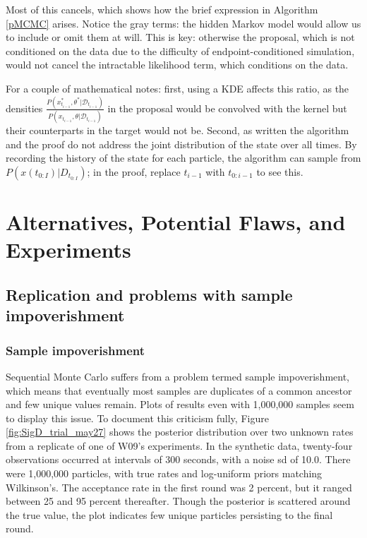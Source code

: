 \documentclass{article}
\begin{document}
Most of this cancels, which shows how the brief expression in Algorithm \ref{pMCMC} arises. Notice the gray terms: the hidden Markov model would allow us to include or omit them at will. This is key: otherwise the proposal, which is not conditioned on the data due to the difficulty of endpoint-conditioned simulation, would not cancel the intractable likelihood term, which conditions on the data.

 For a couple of mathematical notes: first, using a KDE affects this ratio, as the densities $\frac{P(x_{t_{i-1}}^*,\theta^*| \mathcal{D}_{t_{i-1}})}{P(x_{t_{i-1}}, \theta| \mathcal{D}_{t_{i-1}})}$ in the proposal would be convolved with the kernel but their counterparts in the target would not be. Second, as written the algorithm and the proof do not address the joint distribution of the state over all times. By recording the history of the state for each particle, the algorithm can sample from $P(x(t_{0:I})|D_{t_{0:I}})$; in the proof, replace $t_{i-1}$ with $t_{0:i-1}$ to see this. 

\section{Alternatives, Potential Flaws, and Experiments}
\subsection{Replication and problems with sample impoverishment}

\subsubsection{Sample impoverishment}
Sequential Monte Carlo suffers from a problem termed sample impoverishment, which means that eventually most samples are duplicates of a common ancestor and few unique values remain. Plots of results even with 1,000,000 samples seem to display this issue. To document this criticism fully, Figure \ref{fig:SigD_trial_may27} shows the posterior distribution over two unknown rates from a replicate of one of W09's experiments. In the synthetic data, twenty-four observations occurred at intervals of 300 seconds, with a noise sd of 10.0. There were 1,000,000 particles, with true rates and log-uniform priors matching Wilkinson's. The acceptance rate in the first round was 2 percent, but it ranged between 25 and 95 percent thereafter. Though the posterior is scattered around the true value, the plot indicates few unique particles persisting to the final round. 
\end{document}
